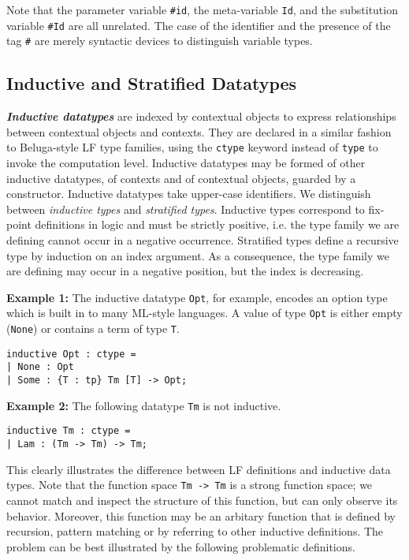 \documentclass[11pt]{article}
\begin{document}
Note that the parameter variable \verb+#id+, the meta-variable \verb+Id+, and the substitution variable \verb+#Id+ are all unrelated.
The case of the identifier and the presence of the tag \verb+#+ are merely syntactic devices to distinguish variable types.

\subsection{Inductive and Stratified Datatypes}

\textbf{\textit{Inductive datatypes}} are indexed by contextual objects to express relationships between contextual objects and contexts.
They are declared in a similar fashion to Beluga-style LF type families, using the \verb+ctype+ keyword instead of \verb+type+ to invoke the computation level.
Inductive datatypes may be formed of other inductive datatypes, of contexts and of contextual objects, guarded by a constructor.
Inductive datatypes take upper-case identifiers.
We distinguish between \textit{inductive types} and \textit{stratified types}.
Inductive types correspond to fix-point definitions in logic and must be strictly positive, i.e.
the type family we are defining cannot occur in a negative occurrence.
Stratified types define a recursive type by induction on an index argument.
As a consequence, the type family we are defining may occur in a negative position, but the index is decreasing.

\textbf{Example 1:} The inductive datatype \verb+Opt+, for example, encodes an option type which is built in to many ML-style languages. A value of type \verb+Opt+ is either empty (\verb+None+) or contains a term of type \verb+T+.
\begin{verbatim}
inductive Opt : ctype =
| None : Opt
| Some : {T : tp} Tm [T] -> Opt;
\end{verbatim}

\textbf{Example 2:} The following datatype \verb+Tm+ is not inductive.
\begin{verbatim}
inductive Tm : ctype =
| Lam : (Tm -> Tm) -> Tm;
\end{verbatim}

This clearly illustrates the difference between LF definitions and inductive data types.
Note that the function space \verb+Tm -> Tm+ is a strong function space; we cannot match and inspect the structure of this function, but can only observe its behavior.
Moreover, this function may be an arbitary function that is defined by recursion, pattern matching or by referring to other inductive definitions.
The problem can be best illustrated by the following problematic definitions.
\end{document}
